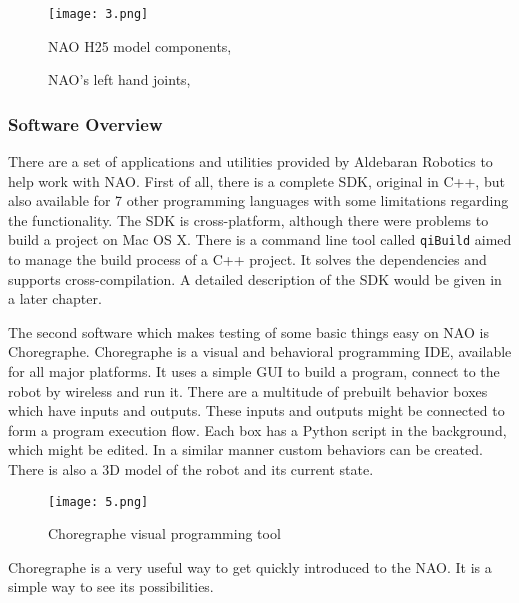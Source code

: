         \begin{figure}[b!]
             \texttt{[image: 3.png]}
            \centering
            \caption{NAO H25 model components, \cite{naoDocumentation}}
            \label{H25model}
        \end{figure}
      \begin{figure}[b]
        \centering
        \hfil 
        \caption{NAO's left hand joints, \cite{naoDocumentation}}
        \label{NaoleftHand}
      \end{figure}
    \subsubsection{Software Overview}
        There are a set of applications and utilities provided by Aldebaran Robotics to help work with NAO. First of all, there is a complete SDK, original in C++, but also available for 7 other programming languages with some limitations regarding the functionality. The SDK is cross-platform, although there were problems to build a project on Mac OS X. There is a command line tool called \verb|qiBuild| aimed to manage the build process of a C++ project. It solves the dependencies and supports cross-compilation. A detailed description of the SDK would be given in a later chapter.

        The second software which makes testing of some basic things easy on NAO is Choregraphe. Choregraphe is a visual and behavioral programming IDE, available for all major platforms. It uses a simple GUI to build a program, connect to the robot by wireless and run it. There are a multitude of prebuilt behavior boxes which have inputs and outputs. These inputs and outputs might be connected to form a program execution flow. Each box has a Python script in the background, which might be edited. In a similar manner custom behaviors can be created. There is also a 3D model of the robot and its current state.
        \begin{figure}[t!]
             \texttt{[image: 5.png]} 
            \centering
            \caption{Choregraphe visual programming tool}
            \label{choreographe}
        \end{figure}
        Choregraphe is a very useful way to get quickly introduced to the NAO. It is a simple way to see its possibilities.

